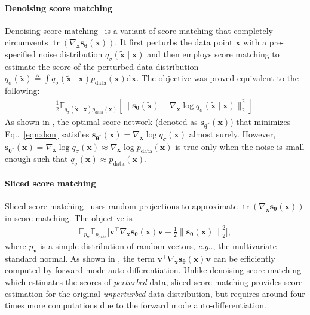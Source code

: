 \documentclass{article}
\makeatletter
\newcommand{\mbb}[1]{\mathbb{#1}}
\newcommand{\ud}{\mathrm{d}}
\newcommand{\norm}[1]{\left\lVert#1\right\rVert}
\def\@onedot{\ifx\@let@token.\else.\null\fi\xspace}
\DeclareRobustCommand\onedot{\futurelet\@let@token\@onedot}
\newcommand{\eqnref}[1]{Eq\onedot~\eqref{#1}}
\newcommand{\bfx}{\mathbf{x}}
\newcommand{\bfv}{\mathbf{v}}
\newcommand{\bftheta}{{\boldsymbol{\theta}}}
\newcommand{\bfs}{\mathbf{s}}
\def\eg{\emph{e.g}\onedot}
\makeatother
\begin{document}
\paragraph{Denoising score matching} Denoising score matching~\cite{vincent2011connection} is a variant of score matching that completely circumvents $\operatorname{tr}(\nabla_\bfx \bfs_\bftheta(\bfx))$. It first perturbs the data point $\bfx$ with a pre-specified noise distribution $q_\sigma(\tilde{\bfx} \mid \bfx)$ and then employs score matching to estimate the score of the perturbed data distribution $q_\sigma(\tilde{\bfx}) \triangleq \int q_\sigma(\tilde{\bfx}\mid \bfx) p_\text{data}(\bfx)\ud \bfx$. The objective was proved equivalent to the following:
\begin{align}
    \frac{1}{2}\mbb{E}_{q_\sigma(\tilde{\bfx}\mid \bfx)p_\text{data}(\bfx)}[\| \bfs_\bftheta(\tilde{\bfx}) - \nabla_{\tilde{\bfx}} \log q_\sigma(\tilde{\bfx}\mid \bfx) \|_2^2]. \label{eqn:dsm}
\end{align}
As shown in \cite{vincent2011connection}, the optimal score network (denoted as $\bfs_{\bftheta^*}(\bfx)$) that minimizes \eqnref{eqn:dsm} satisfies $\bfs_{\bftheta^*}(\bfx) = \nabla_\bfx \log q_\sigma(\bfx)$ almost surely. However, $\bfs_{\bftheta^*}(\bfx) = \nabla_\bfx \log q_\sigma(\bfx) \approx \nabla_\bfx \log p_\text{data}(\bfx)$ is true only when the noise is small enough such that $q_\sigma(\bfx) \approx p_\text{data}(\bfx)$.

\paragraph{Sliced score matching}
Sliced score matching~\cite{song2019ssm} uses random projections to approximate $\operatorname{tr}(\nabla_{\bfx} \bfs_\bftheta(\bfx))$ in score matching. The objective is
\begin{align}
    \mbb{E}_{p_\bfv} \mbb{E}_{p_\text{data}}\bigg[\bfv^\intercal \nabla_\bfx \bfs_\bftheta(\bfx) \bfv  + 
    \frac{1}{2} \norm{\bfs_\bftheta(\bfx)}_2^2 \bigg], \label{eqn:ssm}
\end{align}
where $p_\bfv$ is a simple distribution of random vectors, \eg, the multivariate standard normal. As shown in \cite{song2019ssm}, the term $\bfv^\intercal \nabla_\bfx \bfs_\bftheta(\bfx) \bfv$ can be efficiently computed by forward mode auto-differentiation. Unlike denoising score matching which estimates the scores of \emph{perturbed} data, sliced score matching provides score estimation for the original \emph{unperturbed} data distribution, but requires around four times more computations due to the forward mode auto-differentiation.
\end{document}
